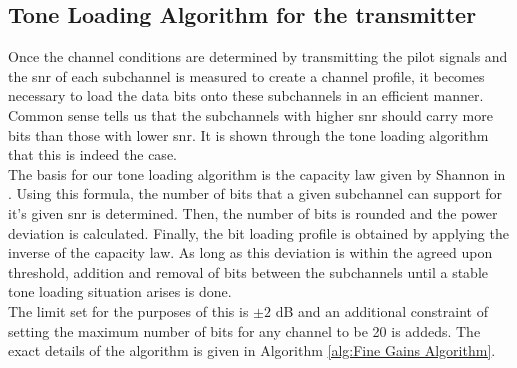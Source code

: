 \subsection{Tone Loading Algorithm for the transmitter}
Once the channel conditions are determined by transmitting the pilot signals and the \acrshort{snr} of each subchannel is measured to create a channel profile, it becomes necessary to load the data bits onto these subchannels in an efficient manner. Common sense tells us that the subchannels with higher \acrshort{snr} should carry more bits than those with lower \acrshort{snr}. It is shown through the tone loading algorithm that this is indeed the case.\\
The basis for our tone loading algorithm is the capacity law given by Shannon in \textcite{Shannnon1948}. Using this formula, the number of bits that a given subchannel can support for it's given \acrshort{snr} is determined. Then, the number of bits is rounded and the power deviation is calculated. Finally, the bit loading profile is obtained by applying the inverse of the capacity law. As long as this deviation is within the agreed upon threshold, addition and removal of bits between the subchannels until a stable tone loading situation arises is done.\\
The limit set for the purposes of this is $\pm 2$ dB and an additional constraint of setting the maximum number of bits for any channel to be 20 is addeds. The exact details of the algorithm is given in Algorithm \ref{alg:Fine Gains Algorithm}.

